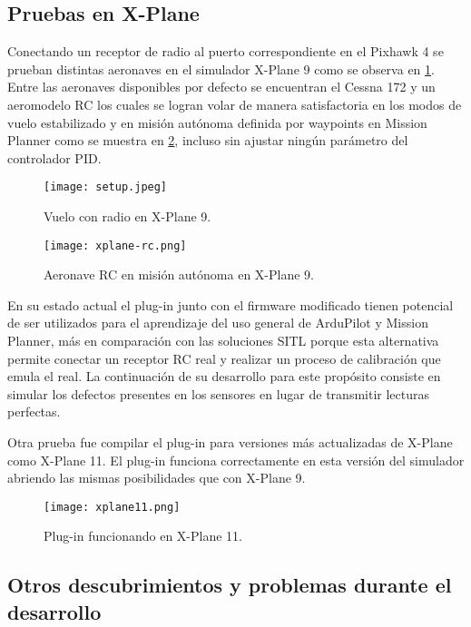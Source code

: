 \subsection{Pruebas en X-Plane}

Conectando un receptor de radio al puerto correspondiente en el Pixhawk 4 se prueban distintas aeronaves en el simulador X-Plane 9 como se observa en \cref{fig:setup}. Entre las aeronaves disponibles por defecto se encuentran el Cessna 172 y un aeromodelo RC los cuales se logran volar de manera satisfactoria en los modos de vuelo estabilizado y en misión autónoma definida por waypoints en Mission Planner como se muestra en \cref{fig:xplane-rc}, incluso sin ajustar ningún parámetro del controlador PID.

\begin{figure}[h]
    \centering
    \texttt{[image: setup.jpeg]}
    \caption{Vuelo con radio en X-Plane 9.}
    \label{fig:setup}
\end{figure}

\begin{figure}[h]
    \centering
    \texttt{[image: xplane-rc.png]}
    \caption{Aeronave RC en misión autónoma en X-Plane 9.}
    \label{fig:xplane-rc}
\end{figure}

En su estado actual el plug-in junto con el firmware modificado tienen potencial de ser utilizados para el aprendizaje del uso general de ArduPilot y Mission Planner, más en comparación con las soluciones SITL porque esta alternativa permite conectar un receptor RC real y realizar un proceso de calibración que emula el real. La continuación de su desarrollo para este propósito consiste en simular los defectos presentes en los sensores en lugar de transmitir lecturas perfectas.

Otra prueba fue compilar el plug-in para versiones más actualizadas de X-Plane como X-Plane 11. El plug-in funciona correctamente en esta versión del simulador abriendo las mismas posibilidades que con X-Plane 9.

\begin{figure}[h]
    \centering
    \texttt{[image: xplane11.png]}
    \caption{Plug-in funcionando en X-Plane 11.}
    \label{fig:xplane11}
\end{figure}

\subsection{Otros descubrimientos y problemas durante el desarrollo}

